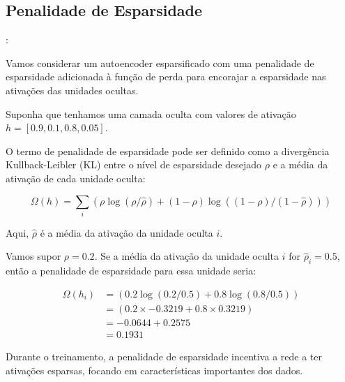 \begin{apendicesenv}
	\section{Penalidade de Esparsidade}:
		\par Vamos considerar um autoencoder esparsificado com uma penalidade de esparsidade adicionada à função de perda para encorajar a esparsidade nas ativações das unidades ocultas.


		\par Suponha que tenhamos uma camada oculta com valores de ativação \( h = [0.9, 0.1, 0.8, 0.05] \).

		\par O termo de penalidade de esparsidade pode ser definido como a divergência Kullback-Leibler (KL) entre o nível de esparsidade desejado \( \rho \) e a média da ativação de cada unidade oculta:
			
		\begin{equation}
			\Omega(h) = \sum_i (\rho \log(\rho / \hat{\rho}) + (1 - \rho) \log((1 - \rho) / (1 - \hat{\rho})))
		\end{equation}
		
		
		\par Aqui, $ \hat{\rho} $ é a média da ativação da unidade oculta $ i $.

		\par  Vamos supor $ \rho = 0.2 $. Se a média da ativação da unidade oculta $ i $ for $ \hat{\rho}_i = 0.5 $, então a penalidade de esparsidade para essa unidade seria:
		
		\begin{equation}
			\begin{aligned}
				\Omega(h_i) &= (0.2 \log(0.2 / 0.5) + 0.8 \log(0.8 / 0.5)) \\
							&= (0.2 \times -0.3219 + 0.8 \times 0.3219) \\
							&= -0.0644 + 0.2575 \\
							&= 0.1931 
			\end{aligned}
		\end{equation}
		\par Durante o treinamento, a penalidade de esparsidade incentiva a rede a ter ativações esparsas, focando em características importantes dos dados.

\end{apendicesenv}









